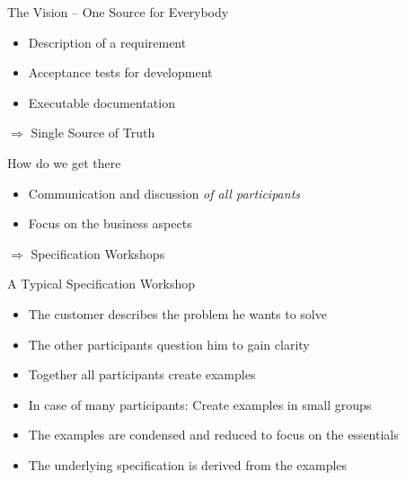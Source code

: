\begin{frame}{The Vision -- One Source for Everybody}

\begin{itemize}
	\item Description of a requirement

	\item Acceptance tests for development

	\item Executable documentation
\end{itemize}

\vspace{1em}

$\Rightarrow$ Single Source of Truth

\end{frame}


\begin{frame}{How do we get there}


\begin{itemize}
	\item Communication and discussion \em of all \em participants 
	
	\item Focus on the business aspects
\end{itemize}


\vspace{1em}

$\Rightarrow$ Specification Workshops

\end{frame}



\begin{frame}{A Typical Specification Workshop}

\begin{itemize}
	\item The customer describes the problem he wants to solve
	\item The other participants question him to gain clarity
	\item Together all participants create examples
        \item In case of many participants: Create examples in small groups
	\item The examples are condensed and reduced to focus on the essentials
	\item The underlying specification is derived from the examples
\end{itemize}

\end{frame}



